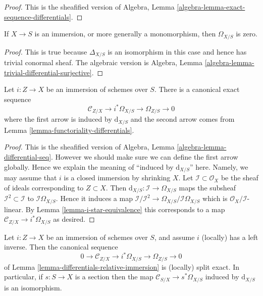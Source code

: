\begin{proof}
This is the sheafified version of
Algebra, Lemma \ref{algebra-lemma-exact-sequence-differentials}.
\end{proof}

\begin{lemma}
\label{lemma-immersion-differentials}
If $X \to S$ is an immersion, or more generally a monomorphism, then
$\Omega_{X/S}$ is zero.
\end{lemma}

\begin{proof}
This is true because $\Delta_{X/S}$ is an isomorphism in this case
and hence has trivial conormal sheaf. The algebraic version is
Algebra, Lemma \ref{algebra-lemma-trivial-differential-surjective}.
\end{proof}

\begin{lemma}
\label{lemma-differentials-relative-immersion}
Let $i : Z \to X$ be an immersion of schemes over $S$.
There is a canonical exact sequence
$$
\mathcal{C}_{Z/X} \to i^*\Omega_{X/S} \to \Omega_{Z/S} \to 0
$$
where the first arrow is induced by $\text{d}_{X/S}$
and the second arrow comes from Lemma \ref{lemma-functoriality-differentials}.
\end{lemma}

\begin{proof}
This is the sheafified version of
Algebra, Lemma \ref{algebra-lemma-differential-seq}. However
we should make sure we can define the first arrow globally.
Hence we explain the meaning of ``induced by $\text{d}_{X/S}$'' here.
Namely, we may assume that $i$ is a closed immersion by
shrinking $X$. Let $\mathcal{I} \subset \mathcal{O}_X$
be the sheaf of ideals corresponding to $Z \subset X$.
Then $\text{d}_{X/S} : \mathcal{I} \to \Omega_{X/S}$
maps the subsheaf $\mathcal{I}^2 \subset \mathcal{I}$ to
$\mathcal{I}\Omega_{X/S}$. Hence it induces a map
$\mathcal{I}/\mathcal{I}^2 \to \Omega_{X/S}/\mathcal{I}\Omega_{X/S}$
which is $\mathcal{O}_X/\mathcal{I}$-linear.
By Lemma \ref{lemma-i-star-equivalence} this corresponds to a map
$\mathcal{C}_{Z/X} \to i^*\Omega_{X/S}$ as desired.
\end{proof}

\begin{lemma}
\label{lemma-differentials-relative-immersion-section}
Let $i : Z \to X$ be an immersion of schemes over $S$, and
assume $i$ (locally) has a left inverse. Then the canonical
sequence
$$
0 \to \mathcal{C}_{Z/X} \to i^*\Omega_{X/S} \to \Omega_{Z/S} \to 0
$$
of
Lemma \ref{lemma-differentials-relative-immersion}
is (locally) split exact. In particular, if $s : S \to X$ is a section
then the map $\mathcal{C}_{S/X} \to s^*\Omega_{X/S}$ induced by
$\text{d}_{X/S}$ is an isomorphism.
\end{lemma}

